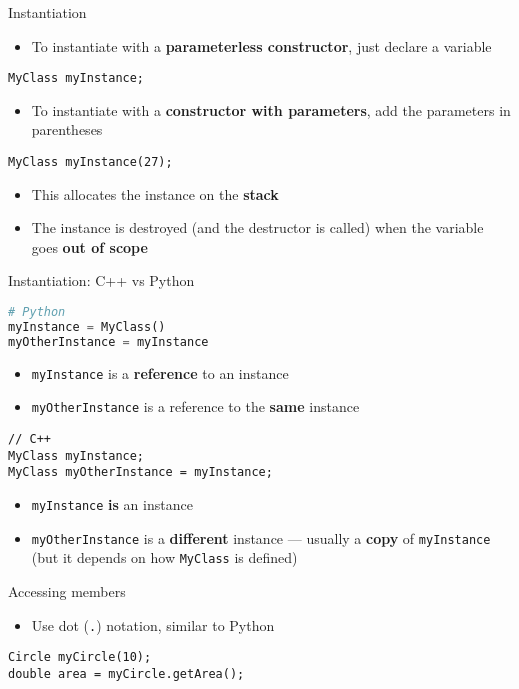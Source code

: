 \begin{frame}[fragile]{Instantiation}
    \begin{itemize}
        \item To instantiate with a \textbf{parameterless constructor}, just declare a variable
    \end{itemize}
    \begin{lstlisting}
MyClass myInstance;
    \end{lstlisting}
    \pause
    \begin{itemize}
        \item To instantiate with a \textbf{constructor with parameters}, add the parameters in parentheses
    \end{itemize}
    \begin{lstlisting}
MyClass myInstance(27);
    \end{lstlisting}
    \pause
    \begin{itemize}
        \item This allocates the instance on the \textbf{stack} \pause
        \item The instance is destroyed (and the destructor is called) when the variable goes \textbf{out of scope}
    \end{itemize}
\end{frame}

\begin{frame}[fragile]{Instantiation: C++ vs Python}
    \pause
    \begin{lstlisting}[language=Python]
# Python
myInstance = MyClass()
myOtherInstance = myInstance
    \end{lstlisting}
    \pause
    \begin{itemize}
        \item \lstinline{myInstance} is a \textbf{reference} to an instance \pause
        \item \lstinline{myOtherInstance} is a reference to the \textbf{same} instance \pause
    \end{itemize}
    \begin{lstlisting}
// C++
MyClass myInstance;
MyClass myOtherInstance = myInstance;
    \end{lstlisting}
    \pause
    \begin{itemize}
        \item \lstinline{myInstance} \textbf{is} an instance \pause
        \item \lstinline{myOtherInstance} is a \textbf{different} instance --- usually a \textbf{copy} of \lstinline{myInstance}
            (but it depends on how \lstinline{MyClass} is defined)
    \end{itemize}
\end{frame}

\begin{frame}[fragile]{Accessing members}
    \begin{itemize}
        \item Use dot (\lstinline{.}) notation, similar to Python
    \end{itemize}
    \pause
    \begin{lstlisting}
Circle myCircle(10);
double area = myCircle.getArea();
    \end{lstlisting}
\end{frame}
